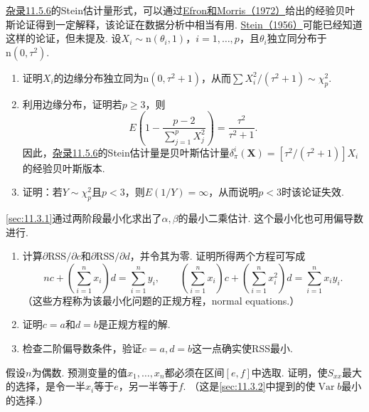 \begin{exercise}\label{exercise:11.24}
\hyperref[sec:11.5.6]{杂录11.5.6}的Stein估计量形式，可以通过\hyperref[bib:source111]{Efron和Morris（1972）}给出的经验贝叶斯论证得到一定解释，该论证在数据分析中相当有用. \hyperref[bib:source301]{Stein（1956）}可能已经知道这样的论证，但未提及. 设$X_i\sim\mathrm n(\theta_i,1)$，$i=1,\ldots,p$，且$\theta_i$独立同分布于$\mathrm n(0,\tau^2)$.
\begin{enumerate}[label=(\alph*)]
\item\label{item:11.24.a} 证明$X_i$的边缘分布独立同为$\mathrm n(0,\tau^2+1)$，从而$\sum X_i^2/(\tau^2+1)\sim\chi^2_p$.
\item\label{item:11.24.b} 利用边缘分布，证明若$p\ge3$，则
$$E\left(1-\frac{p-2}{\sum_{j=1}^pX_j^2}\right)=\frac{\tau^2}{\tau^2+1}.$$
因此，\hyperref[sec:11.5.6]{杂录11.5.6}的Stein估计量是贝叶斯估计量$\delta_\pi^i(\boldsymbol X)=[\tau^2/(\tau^2+1)]X_i$的经验贝叶斯版本.
\item\label{item:11.24.c} 证明：若$Y\sim\chi^2_p$且$p<3$，则$E(1/Y)=\infty$，从而说明$p<3$时该论证失效.
\end{enumerate}
\end{exercise}

\begin{exercise}\label{exercise:11.25}
\autoref{sec:11.3.1}通过两阶段最小化求出了$\alpha,\beta$的最小二乘估计. 这个最小化也可用偏导数进行.
\begin{enumerate}[label=(\alph*)]
\item\label{item:11.25.a} 计算$\partial\mathrm{RSS}/\partial c$和$\partial\mathrm{RSS}/\partial d$，并令其为零. 证明所得两个方程可写成
$$nc+\left(\sum_{i=1}^nx_i\right)d=\sum_{i=1}^ny_i,
\qquad
\left(\sum_{i=1}^nx_i\right)c+\left(\sum_{i=1}^nx_i^2\right)d=\sum_{i=1}^nx_iy_i.$$
（这些方程称为该最小化问题的正规方程，normal equations.）
\item\label{item:11.25.b} 证明$c=a$和$d=b$是正规方程的解.
\item\label{item:11.25.c} 检查二阶偏导数条件，验证$c=a,d=b$这一点确实使RSS最小.
\end{enumerate}
\end{exercise}

\begin{exercise}\label{exercise:11.26}
假设$n$为偶数. 预测变量的值$x_1,\ldots,x_n$都必须在区间$[e,f]$中选取. 证明，使$S_{xx}$最大的选择，是令一半$x_i$等于$e$，另一半等于$f$. （这是\autoref{sec:11.3.2}中提到的使$\operatorname{Var}b$最小的选择.）
\end{exercise}


